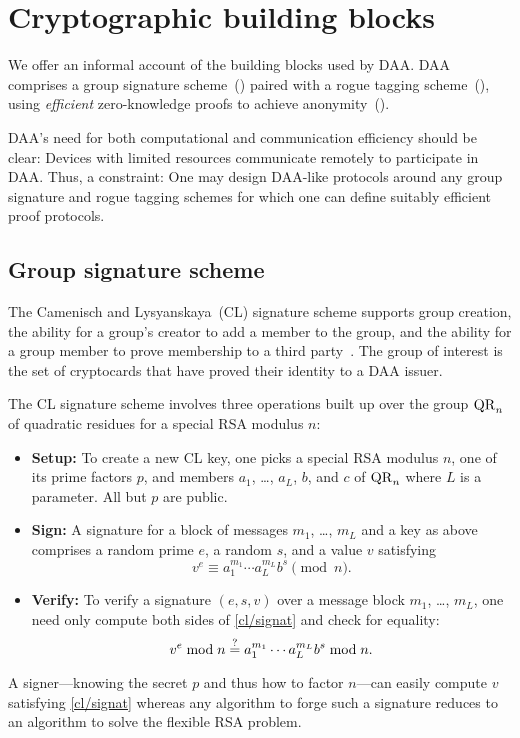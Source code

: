 \section{Cryptographic building blocks}

We offer an informal account of the building blocks used by DAA.
DAA comprises a group signature scheme~() paired with a rogue tagging scheme~(), using \emph{efficient} zero-knowledge proofs to achieve anonymity~().

DAA's need for both computational and communication efficiency should be clear:
Devices with limited resources communicate remotely to participate in DAA.
Thus, a constraint: One may design DAA-like protocols around any group
signature and rogue tagging schemes for which one can define suitably efficient
proof protocols.

\subsection{Group signature scheme}

The Camenisch and Lysyanskaya~(CL) signature scheme
supports group creation,
the ability for a group's creator to add a member to the group,
and the ability for a group member to prove membership to a third party~\cite{cl}.
The group of interest is the set of cryptocards that have proved
their identity to a DAA issuer.

The CL signature scheme
involves three operations built up over the group $\mathrm{QR}_n$
of quadratic residues for a special RSA modulus $n$:
\begin{itemize}

\item \textbf{Setup:} To create a new CL key,
one picks a special RSA modulus $n$, one of its prime
factors $p$,
and members $a_1$, \ldots, $a_L$, $b$, and $c$ of $\mathrm{QR}_n$
where $L$ is a parameter.
All but $p$ are public.

\item \textbf{Sign:}
A signature for a block of messages $m_1$, \ldots, $m_L$
and a key as above comprises a random prime $e$, a random $s$, and a
value $v$ satisfying
\begin{equation}\label{cl/signat}
	v^e \equiv a_1^{m_1} \cdots a_L^{m_L} b^s \pmod n.
\end{equation}

\item \textbf{Verify:}
To verify a signature $(e, s, v)$ over a message block $m_1$, \ldots, $m_L$,
one need only compute both sides of \eqref{cl/signat} and check for equality:
$$	
	v^e \bmod n \mathrel{\overset{\mathrm{?}}{=}} a_1^{m_1} \cdots a_L^{m_L} b^s \bmod n.
$$
\end{itemize}
A signer---knowing the secret $p$ and thus how to factor $n$---can
easily compute $v$ satisfying \eqref{cl/signat}
whereas any algorithm to forge such a signature
reduces to an algorithm to solve the flexible RSA problem.

